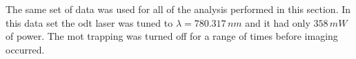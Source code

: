 The same set of data was used for all of the analysis performed in this section. In this data set the \gls{odt} laser was tuned to $\lambda=780.317\,\unit{nm}$ and it had only $358\,\unit{mW}$ of power. The \gls{mot} trapping was turned off for a range of times before imaging occurred.

\begin{figure}[h]
    \centering
    \begin{subfigure}[b]{0.3\textwidth}
    \end{subfigure}\begin{subfigure}[b]{0.3\textwidth}
\end{subfigure}
\end{figure}
